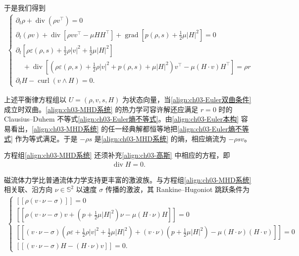 ﻿\documentclass[../../main.tex]{subfiles}
\begin{document}
于是我们得到
\begin{align}
\begin{cases}
\partial_{t}\rho+\operatorname{div}(\rho v^{\top})=0\\
\partial_{t}(\rho v)+\operatorname{div}\left[\rho vv^{\top}-\mu HH^{\top}\right]+\operatorname{grad}\left[p(\rho,s)+\frac{1}{2}\mu|H|^{2}\right]=0\\
\partial_{t}\left[\rho\varepsilon(\rho,s)+\frac{1}{2}\rho|v|^{2}+\frac{1}{2}\mu|H|^{2}\right]\\
\quad+\operatorname{div}\left[\left(\rho\varepsilon(\rho,s)+\frac{1}{2}\rho|v|^{2}+p(\rho,s)+\mu|H|^{2}\right)v^{\top}-\mu(H\cdot v)H^{\top}\right]=\rho r\\
\partial_{t}H-\operatorname{curl}(v\wedge H)=0.
\end{cases}
\label{align:ch03-MHD系统}
\end{align}

上述平衡律方程组以 $U=(\rho,v,s,H)$ 为状态向量，当\eqref{align:ch03-Euler双曲条件} 成立时双曲。\eqref{align:ch03-MHD系统} 的热力学可容许解还应满足 $r=0$ 时的 Clausius--Duhem 不等式\eqref{align:ch03-Euler熵不等式}。由\eqref{align:ch03-Euler本构} 容易看出，\eqref{align:ch03-MHD系统} 的任一经典解都恒等地把\eqref{align:ch03-Euler熵不等式} 作为等式满足。于是 $-\rho s$ 是\eqref{align:ch03-MHD系统} 的熵，相应熵流为 $-\rho s v$。

方程组\eqref{align:ch03-MHD系统} 还须补充\eqref{align:ch03-高斯} 中相应的方程，即
\begin{align}
\operatorname{div}H=0.
\label{align:ch03-无散H}
\end{align}

磁流体力学比普通流体力学支持更丰富的激波族。与方程组\eqref{align:ch03-MHD系统} 相关联、沿方向 $\nu\in\mathbb{S}^{2}$ 以速度 $\sigma$ 传播的激波，其 Rankine--Hugoniot 跳跃条件为
\begin{align}
\begin{cases}
[\![\rho(v\cdot\nu-\sigma)]\!]=0\\
[\![\rho(v\cdot\nu-\sigma)v+\left(p+\frac{1}{2}\mu|H|^{2}\right)\nu-\mu(H\cdot\nu)H]\!]=0\\
[\![(v\cdot\nu-\sigma)\left(\rho\varepsilon+\frac{1}{2}\rho|v|^{2}+\frac{1}{2}\mu|H|^{2}\right)+(v\cdot\nu)\left(p+\frac{1}{2}\mu|H|^{2}\right)-\mu(H\cdot\nu)(H\cdot v)]\!]=0\\
[\![(v\cdot\nu-\sigma)H-(H\cdot\nu)v]\!]=0.
\end{cases}
\label{align:ch03-MHD-RH}
\end{align}
\end{document}
